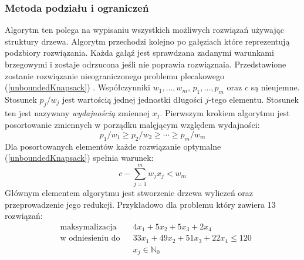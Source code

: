 \subsubsection{Metoda podziału i ograniczeń}
Algorytm ten polega na wypisaniu wszystkich możliwych rozwiązań używając struktury drzewa. Algorytm przechodzi kolejno po gałęziach które reprezentują podzbiory rozwiązania. Każda gałąź jest sprawdzana zadanymi warunkami brzegowymi i zostaje odrzucona jeśli nie poprawia rozwiąznaia. Przedstawione zostanie rozwiązanie nieograniczonego problemu plecakowego (\ref{unboundedKnapsack}) \cite{ChvatalBook}. Współczynniki $w_1,\dots,w_m$, $p_1, \dots, p_m$ oraz $c$ są nieujemne. Stosunek $p_j/w_j$ jest wartością jednej jednostki długości $j$-tego elementu. Stosunek ten jest nazywany \textit{wydajnością} zmiennej $x_j$. Pierwszym krokiem algorytmu jest posortowanie zmiennych w porządku malęjącym względem wydajności:
\begin{equation} \label{eq:BBeff}
  p_1/w_1 \ge p_2/w_2 \ge \cdots \ge p_m/w_m
\end{equation}
Dla posortowanych elementów każde rozwiązanie optymalne (\ref{unboundedKnapsack}) spełnia warunek:
\begin{equation}
  c - \sum_{j=1}^m w_jx_j < w_m
\end{equation}
Głównym elementem algorytmu jest stworzenie drzewa wyliczeń oraz przeprowadzenie jego redukcji. Przykładowo dla problemu który zawiera 13 rozwiązań:
\begin{equation*}
  \begin{aligned}
    & \textrm{maksymalizacja} & &  4x_1 + 5x_2 + 5x_3 + 2x_4\\
    & \textrm{w odniesieniu do} & & 33x_1 + 49x_2 + 51x_3+22x_4 \le 120\\
    &&& x_j \in \mathbb{N}_0
  \end{aligned}
\end{equation*}
